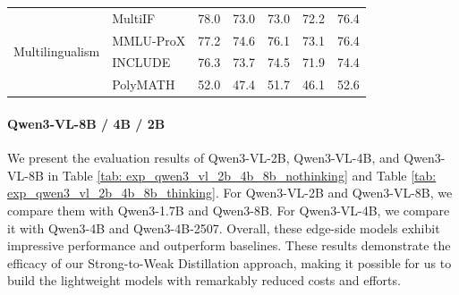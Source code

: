\begin{table}[t]
\begin{tabular}{lllllll}
\midrule
\multirow{4}{*}{Multilingualism} & MultiIF                & 78.0                  & 73.0               & 73.0                   & 72.2                   & 76.4                        \\
                                 & MMLU-ProX              & 77.2                  & 74.6               & 76.1                   & 73.1                   & 76.4                        \\
                                 & INCLUDE                & 76.3                  & 73.7               & 74.5                   & 71.9                   & 74.4                        \\
                                 & PolyMATH               & 52.0                  & 47.4               & 51.7                   & 46.1                   & 52.6   \\
\bottomrule
\end{tabular}
\label{tab: exp_qwen3_vl_30b_a3b_thinking}
\end{table}




\paragraph{Qwen3-VL-8B / 4B / 2B}
We present the evaluation results of Qwen3-VL-2B, Qwen3-VL-4B, and Qwen3-VL-8B in Table \ref{tab: exp_qwen3_vl_2b_4b_8b_nothinking} and Table \ref{tab: exp_qwen3_vl_2b_4b_8b_thinking}. For Qwen3-VL-2B and Qwen3-VL-8B, we compare them with Qwen3-1.7B and Qwen3-8B. For Qwen3-VL-4B, we compare it with Qwen3-4B and Qwen3-4B-2507. Overall, these edge-side models exhibit impressive performance and outperform baselines. These results demonstrate the efficacy of our Strong-to-Weak Distillation approach, making it possible for us to build the lightweight models with remarkably reduced costs and efforts.

